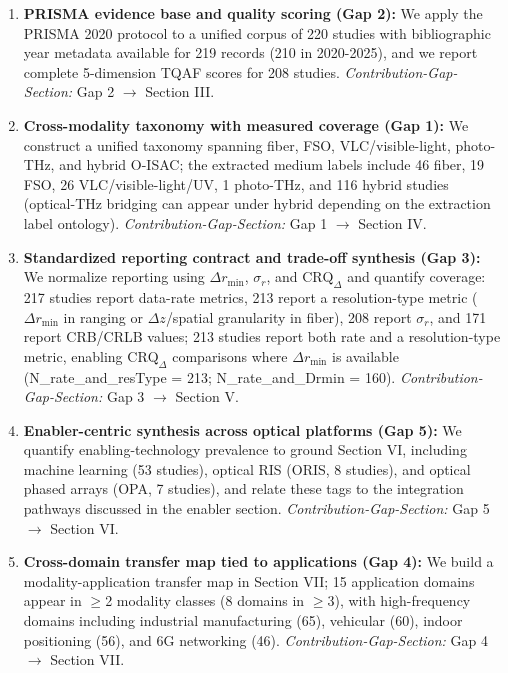 \documentclass[lettersize,journal]{IEEEtran}
\begin{document}
\begin{enumerate}
    \item \textbf{PRISMA evidence base and quality scoring (Gap 2):} We apply the PRISMA 2020 protocol \cite{PRISMA2020} to a unified corpus of 220 studies with bibliographic year metadata available for 219 records (210 in 2020-2025), and we report complete 5-dimension TQAF scores for 208 studies. \textit{Contribution-Gap-Section:} Gap 2 $\rightarrow$ Section III.
    \item \textbf{Cross-modality taxonomy with measured coverage (Gap 1):} We construct a unified taxonomy spanning fiber, FSO, VLC/visible-light, photo-THz, and hybrid O-ISAC; the extracted medium labels include 46 fiber, 19 FSO, 26 VLC/visible-light/UV, 1 photo-THz, and 116 hybrid studies (optical-THz bridging can appear under hybrid depending on the extraction label ontology). \textit{Contribution-Gap-Section:} Gap 1 $\rightarrow$ Section IV.
    \item \textbf{Standardized reporting contract and trade-off synthesis (Gap 3):} We normalize reporting using $\Delta r_{\min}$, $\sigma_r$, and $\text{CRQ}_{\Delta}$ and quantify coverage: 217 studies report data-rate metrics, 213 report a resolution-type metric ($\Delta r_{\min}$ in ranging or $\Delta z$/spatial granularity in fiber), 208 report $\sigma_r$, and 171 report CRB/CRLB values; 213 studies report both rate and a resolution-type metric, enabling $\text{CRQ}_{\Delta}$ comparisons where $\Delta r_{\min}$ is available (N\_rate\_and\_resType = 213; N\_rate\_and\_Drmin = 160). \textit{Contribution-Gap-Section:} Gap 3 $\rightarrow$ Section V.
    \item \textbf{Enabler-centric synthesis across optical platforms (Gap 5):} We quantify enabling-technology prevalence to ground Section VI, including machine learning (53 studies), optical RIS (ORIS, 8 studies), and optical phased arrays (OPA, 7 studies), and relate these tags to the integration pathways discussed in the enabler section. \textit{Contribution-Gap-Section:} Gap 5 $\rightarrow$ Section VI.
    \item \textbf{Cross-domain transfer map tied to applications (Gap 4):} We build a modality-application transfer map in Section VII; 15 application domains appear in $\ge$2 modality classes (8 domains in $\ge$3), with high-frequency domains including industrial manufacturing (65), vehicular (60), indoor positioning (56), and 6G networking (46). \textit{Contribution-Gap-Section:} Gap 4 $\rightarrow$ Section VII.
\end{enumerate}
\end{document}
